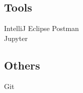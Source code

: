 \documentclass[]{deedy-resume-openfont}
\begin{document}
\begin{minipage}[t]{0.33\textwidth}
\subsection{Tools}
\textbullet{} IntelliJ \textbullet{} Eclipse \textbullet{} Postman\\
\textbullet{} Jupyter\\
\vspace{0.3em} %
\subsection{Others}
\textbullet{} Git \\
\sectionsep

%
%

\end{minipage} 
\hfill
\end{document}
